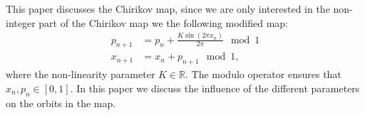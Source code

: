 This paper discusses the Chirikov map, since we are only interested in the non-integer part of the Chirikov map we the following modified map:
\begin{subequations}\label{eq:chirikov}
	\begin{align}
		\label{eq:chirikov:p} p_{n + 1} &= p_n + \frac{K \sin \left(  2 \pi x_n \right)}{2 \pi} \mod 1 \\
		\label{eq:chirikov:x} x_{n + 1} &= x_n + p_{n + 1} \mod 1,
	\end{align}
\end{subequations}	
where the non-linearity parameter $K \in \mathbb{R}$. The modulo operator ensures that $x_n, p_n \in \left[ 0, 1 \right]$. In this paper we discuss the influence of the different parameters on the orbits in the map.